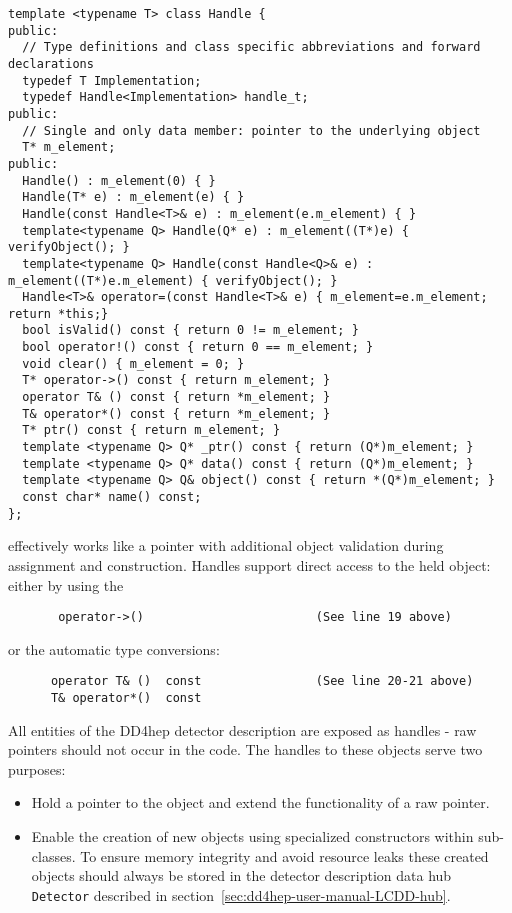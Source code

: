 \begin{verbatim}
template <typename T> class Handle {
public:
  // Type definitions and class specific abbreviations and forward declarations
  typedef T Implementation;
  typedef Handle<Implementation> handle_t;
public:
  // Single and only data member: pointer to the underlying object
  T* m_element;
public:
  Handle() : m_element(0) { }
  Handle(T* e) : m_element(e) { }
  Handle(const Handle<T>& e) : m_element(e.m_element) { }
  template<typename Q> Handle(Q* e) : m_element((T*)e) { verifyObject(); }
  template<typename Q> Handle(const Handle<Q>& e) : m_element((T*)e.m_element) { verifyObject(); }
  Handle<T>& operator=(const Handle<T>& e) { m_element=e.m_element; return *this;}
  bool isValid() const { return 0 != m_element; }
  bool operator!() const { return 0 == m_element; }
  void clear() { m_element = 0; }
  T* operator->() const { return m_element; }
  operator T& () const { return *m_element; }
  T& operator*() const { return *m_element; }
  T* ptr() const { return m_element; }
  template <typename Q> Q* _ptr() const { return (Q*)m_element; }
  template <typename Q> Q* data() const { return (Q*)m_element; }
  template <typename Q> Q& object() const { return *(Q*)m_element; }
  const char* name() const;
};
\end{verbatim}
effectively works like a pointer with additional object validation during assignment and construction. Handles support direct access to the held object: either by using the 
\begin{verbatim}
       operator->()                        (See line 19 above)
\end{verbatim}
or the automatic type conversions:
\begin{verbatim}
      operator T& ()  const                (See line 20-21 above)
      T& operator*()  const
\end{verbatim}

All entities of the DD4hep detector description are exposed as handles - raw pointers should not occur in the code. The handles to these objects serve two purposes:
\begin{itemize}
\item Hold a pointer to the object and extend the functionality of a raw pointer.
\item Enable the creation of new objects using specialized constructors within sub-classes. To ensure memory integrity and avoid resource  leaks these created objects should always be stored in the detector description data hub \texttt{Detector} described in section~\ref{sec:dd4hep-user-manual-LCDD-hub}.
\end{itemize}


